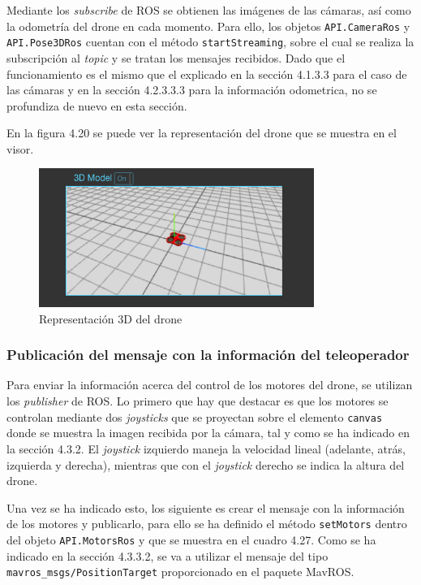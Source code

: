 Mediante los \textit{subscribe} de ROS se obtienen las imágenes de las cámaras, así como la odometría del drone en cada momento. Para ello, los objetos \texttt{API.CameraRos} y \texttt{API.Pose3DRos} cuentan con el método \texttt{startStreaming}, sobre el cual se realiza la subscripción al \textit{topic} y se tratan los mensajes recibidos. Dado que el funcionamiento es el mismo que el explicado en la sección 4.1.3.3 para el caso de las cámaras y en la sección 4.2.3.3.3 para la información odometrica, no se profundiza de nuevo en esta sección.

En la figura 4.20 se puede ver la representación del drone que se muestra en el visor.

\begin{figure}[H]
  \begin{center}
    \includegraphics[width=0.8\textwidth]{figures/3ddrone.png}
		\caption{Representación 3D del drone}
		\label{fig.3ddrone}
		\end{center}
\end{figure}

\subsubsection{Publicación del mensaje con la información del teleoperador}

Para enviar la información acerca del control de los motores del drone, se utilizan los \textit{publisher} de ROS. Lo primero que hay que destacar es que los motores se controlan mediante dos \textit{joysticks} que se proyectan sobre el elemento \texttt{canvas} donde se muestra la imagen recibida por la cámara, tal y como se ha indicado en la sección 4.3.2. El \textit{joystick} izquierdo maneja la velocidad lineal (adelante, atrás, izquierda y derecha), mientras que con el \textit{joystick} derecho se indica la altura del drone.

Una vez se ha indicado esto, los siguiente es crear el mensaje con la información de los motores y publicarlo, para ello se ha definido el método \texttt{setMotors} dentro del objeto \texttt{API.MotorsRos} y que se muestra en el cuadro 4.27. Como se ha indicado en la sección 4.3.3.2, se va a utilizar el mensaje del tipo \texttt{mavros\_msgs/PositionTarget} proporcionado en el paquete MavROS.

